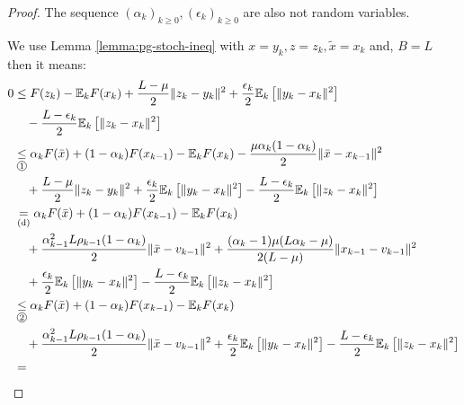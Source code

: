 \documentclass[12pt]{article}
\newcommand{\expect}{\ensuremath{\mathbb E}}
\begin{document}
\begin{proof}
            The sequence $(\alpha_k)_{k \ge 0}, (\epsilon_k)_{k \ge 0}$ are also not random variables. 
            \par
            We use Lemma \ref{lemma:pg-stoch-ineq} with $x = y_k, z = z_k, \tilde x = x_{k}$ and, $B = L$ then it means: 
            {\allowdisplaybreaks
            \begin{align*}
                0 &\le 
                F(z_k) - \expect_k F(x_k) 
                + \frac{L - \mu}{2}\Vert z_k - y_k\Vert^2 
                + \frac{\epsilon_k}{2}\expect_k \left[\Vert y_k - x_k \Vert^2\right] 
                    \\&\quad
                    - \frac{L - \epsilon_k}{2}\expect_k \left[\Vert z_k - x_k\Vert^2\right]
                \\
                &\underset{\circled{1}}{\le} 
                \alpha_k F(\bar x) + (1 - \alpha_k)F(x_{k - 1}) - \expect_k F(x_k) - \frac{\mu\alpha_k(1 - \alpha_k)}{2}\Vert \bar x - x_{k - 1}\Vert^2
                    \\&\quad 
                    + \frac{L - \mu}{2}\Vert z_k - y_k\Vert^2 
                    + \frac{\epsilon_k}{2}\expect_k \left[\Vert y_k - x_k \Vert^2\right] 
                    - \frac{L - \epsilon_k}{2}\expect_k \left[\Vert z_k - x_k\Vert^2\right]
                \\
                &\underset{\text{(d)}}{=}
                \alpha_k F(\bar x) + (1 - \alpha_k)F(x_{k - 1}) - \expect_k F(x_k) 
                    \\&\quad 
                    + \frac{\alpha_{k - 1}^2L \rho_{k - 1}(1 - \alpha_k)}{2}\Vert \bar x - v_{k - 1}\Vert^2
                    + \frac{(\alpha_k - 1)\mu(L\alpha_k - \mu)}{2(L - \mu)}\Vert x_{k - 1} - v_{k - 1}\Vert^2
                    \\&\quad 
                    + \frac{\epsilon_k}{2}\expect_k \left[\Vert y_k - x_k \Vert^2\right] 
                    - \frac{L - \epsilon_k}{2}\expect_k \left[\Vert z_k - x_k\Vert^2\right]
                \\&\underset{\circled{2}}{\le}
                \alpha_k F(\bar x) + (1 - \alpha_k)F(x_{k - 1}) - \expect_k F(x_k) 
                    \\&\quad 
                    + \frac{\alpha_{k - 1}^2L \rho_{k - 1}(1 - \alpha_k)}{2}\Vert \bar x - v_{k - 1}\Vert^2
                    + \frac{\epsilon_k}{2}\expect_k \left[\Vert y_k - x_k \Vert^2\right] 
                    - \frac{L - \epsilon_k}{2}\expect_k \left[\Vert z_k - x_k\Vert^2\right]
                \\&= 

\end{align*}}
\end{proof}
\end{document}
